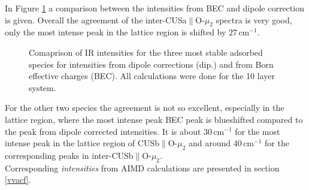 \documentclass[11pt,DIV=13,BCOR=5mm,a4paper,headinclude]{scrbook}
\begin{document}
In Figure \ref{abb:bec-dip-comp} a comparison between the intensities from BEC and dipole correction is given.
Overall the agreement of the inter-CUSa$\parallel$O-$\mu_2$ spectra is very good, only the most intense peak in the lattice region is shifted by $27\,$cm$^{-1}$.
\begin{figure}[!h]
    \centering
              \quad
             \quad
             \caption{Comaprison of IR intensities for the three most stable adsorbed species for intensities from dipole corrections (dip.) and from Born effective charges (BEC). All calculations were done for the 10 layer system.}
            \label{abb:bec-dip-comp}
\end{figure}
For the other two species the agreement is not so excellent, especially in the lattice region, where the most intense peak BEC peak is blueshifted compared to the peak from dipole corrected intensities.
It is about $30\,$cm$^{-1}$ for the most intense peak in the lattice region of CUSb$\parallel$O-$\mu_2$ and around $40\,$cm$^{-1}$ for the corresponding peaks in inter-CUSb$\parallel$O-$\mu_2$.
\\
Corresponding \textit{intensities} from AIMD calculations are presented in section \ref{vvacf}.
\clearpage
\end{document}
